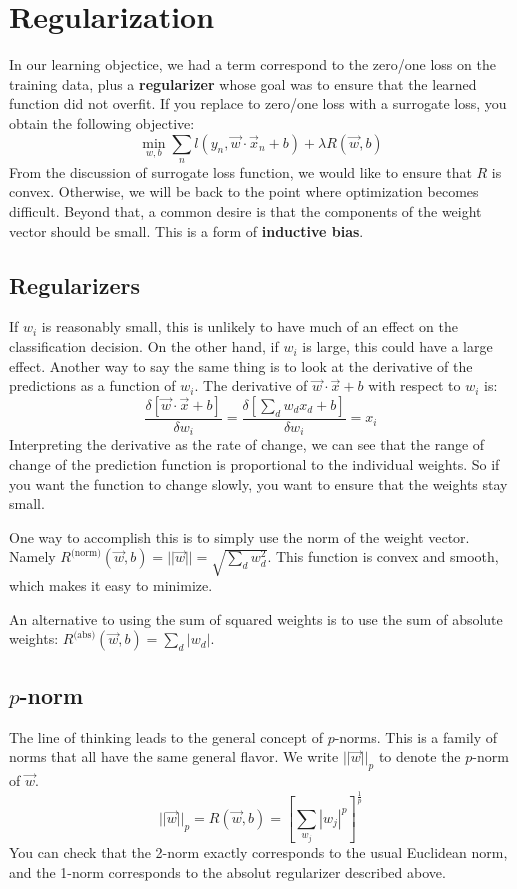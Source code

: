 \chapter{Regularization}
In our learning objectice, we had a term correspond to the zero/one loss on the training data, plus a \textbf{regularizer} whose goal was to ensure that the learned function did not overfit. If you replace to zero/one loss with a surrogate loss, you obtain the following objective:
\begin{equation}
    \min_{w,b} \sum_n l(y_n, \vec{w} \cdot \vec{x}_n + b) + \lambda R(\vec{w},b)
\end{equation}
From the discussion of surrogate loss function, we would like to ensure that \(R\) is convex. Otherwise, we will be back to the point where optimization becomes difficult. Beyond that, a common desire is that the components of the weight vector should be small. This is a form of \textbf{inductive bias}.

\section{Regularizers}

If \(w_i\) is reasonably small, this is unlikely to have much of an effect on the classification decision. On the other hand, if \(w_i\) is large, this could have a large effect. 
Another way to say the same thing is to look at the derivative of the predictions as a function of \(w_i\). The derivative of \(\vec{w} \cdot \vec{x} + b\) with respect to \(w_i\) is:
\begin{equation}
    \frac {\delta [\vec{w} \cdot \vec{x} + b]} {\delta w_i} = \frac {\delta [\sum_d w_d x_d + b]} {\delta w_i} = x_i
\end{equation}
Interpreting the derivative as the rate of change, we can see that the range of change of the prediction function is proportional to the individual weights. So if you want the function to change slowly, you want to ensure that the weights stay small.

One way to accomplish this is to simply use the norm of the weight vector. Namely \(R^\text{(norm)}(\vec{w},b) = ||\vec{w}|| = \sqrt{\sum_d w_d^2}\). This function is convex and smooth, which makes it easy to minimize.

An alternative to using the sum of squared weights is to use the sum of absolute weights: \(R^\text{(abs)}(\vec{w},b) = \sum_d |w_d|\).

\section{\(p\)-norm}
The line of thinking leads to the general concept of \(p\)-norms. This is a family of norms that all have the same general flavor. We write \(||\vec{w}||_p\) to denote the \(p\)-norm of \(\vec{w}\).
\begin{equation}
    ||\vec{w}||_p = R(\vec{w},b) = \left[ {\sum_{w_j} |w_j|^p} \right]^{\frac 1 p}
\end{equation}
You can check that the 2-norm exactly corresponds to the usual Euclidean norm, and the 1-norm corresponds to the absolut regularizer described above.

